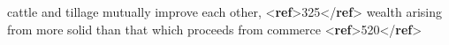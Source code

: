 \begin{shaded}
\hspace*{1em}\hspace*{1em}\hspace*{1em}\hspace*{1em}\mbox{}\newline 
\hspace*{1em}\hspace*{1em}\hspace*{1em}\hspace*{1em}cattle and tillage mutually improve each other, {<\textbf{ref}>}325{</\textbf{ref}>}\mbox{}\newline 
\hspace*{1em}\hspace*{1em}\hspace*{1em}\hspace*{1em}\mbox{}\newline 
\hspace*{1em}\hspace*{1em}\hspace*{1em}\hspace*{1em}wealth arising from more solid than that which proceeds\mbox{}\newline 
\hspace*{1em}\hspace*{1em}\hspace*{1em}\hspace*{1em}\hspace*{1em}\hspace*{1em}\hspace*{1em}\hspace*{1em}\hspace*{1em}\hspace*{1em} from commerce {<\textbf{ref}>}520{</\textbf{ref}>}\mbox{}\newline 
\hspace*{1em}\hspace*{1em}\hspace*{1em}\hspace*{1em}\mbox{}\newline 
\hspace*{1em}\hspace*{1em}\hspace*{1em}\mbox{}\newline 

\end{shaded}
